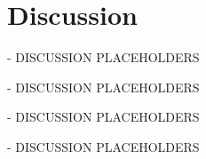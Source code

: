 \chapter{Discussion}\label{ch:discussion}


\begin{tcolorbox}[colback=orange]
- DISCUSSION PLACEHOLDERS
\vspace{20cm}

\end{tcolorbox}
\begin{tcolorbox}[colback=orange]
- DISCUSSION PLACEHOLDERS
\vspace{20cm}

\end{tcolorbox}
\begin{tcolorbox}[colback=orange]
- DISCUSSION PLACEHOLDERS
\vspace{20cm}

\end{tcolorbox}
\begin{tcolorbox}[colback=orange]
- DISCUSSION PLACEHOLDERS
\vspace{20cm}

\end{tcolorbox}

